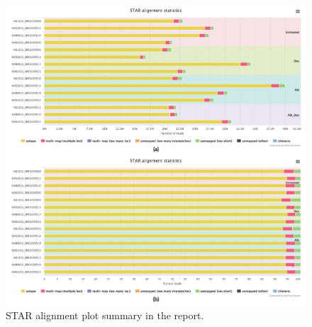 \begin{figure}[!tb]
\centering
\includegraphics[width=1\textwidth]{images/report_align}
\caption[STAR alignment plot in summary report]{
    STAR alignment plot summary in the report.
}
\label{fig:report-align}
\end{figure}
